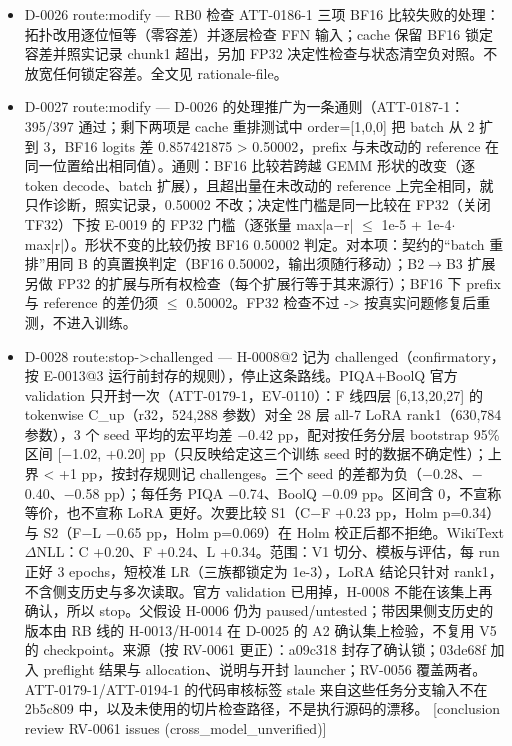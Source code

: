 \documentclass[11pt]{article}
\begin{document}
\begin{itemize}
\item D-0026 route:modify --- RB0 检查 ATT-0186-1 三项 BF16 比较失败的处理：拓扑改用逐位恒等（零容差）并逐层检查 FFN 输入；cache 保留 BF16 锁定容差并照实记录 chunk1 超出，另加 FP32 决定性检查与状态清空负对照。不放宽任何锁定容差。全文见 rationale-file。
\item D-0027 route:modify --- D-0026 的处理推广为一条通则（ATT-0187-1：395/397 通过；剩下两项是 cache 重排测试中 order=[1,0,0] 把 batch 从 2 扩到 3，BF16 logits 差 0.857421875 \textgreater{} 0.50002，prefix 与未改动的 reference 在同一位置给出相同值）。通则：BF16 比较若跨越 GEMM 形状的改变（逐 token decode、batch 扩展），且超出量在未改动的 reference 上完全相同，就只作诊断，照实记录，0.50002 不改；决定性门槛是同一比较在 FP32（关闭 TF32）下按 E-0019 的 FP32 门槛（逐张量 max|a\ensuremath{-}r| \ensuremath{\leq} 1e-5 + 1e-4\ensuremath{\cdot}max|r|）。形状不变的比较仍按 BF16 0.50002 判定。对本项：契约的``batch 重排''用同 B 的真置换判定（BF16 0.50002，输出须随行移动）；B2\ensuremath{\rightarrow}B3 扩展另做 FP32 的扩展与所有权检查（每个扩展行等于其来源行）；BF16 下 prefix 与 reference 的差仍须 \ensuremath{\leq} 0.50002。FP32 检查不过 -\textgreater{} 按真实问题修复后重测，不进入训练。
\item D-0028 route:stop-\textgreater{}challenged --- H-0008@2 记为 challenged（confirmatory，按 E-0013@3 运行前封存的规则），停止这条路线。PIQA+BoolQ 官方 validation 只开封一次（ATT-0179-1，EV-0110）：F 线四层 [6,13,20,27] 的 tokenwise C\_up（r32，524,288 参数）对全 28 层 all-7 LoRA rank1（630,784 参数），3 个 seed 平均的宏平均差 \ensuremath{-}0.42 pp，配对按任务分层 bootstrap 95\% 区间 [\ensuremath{-}1.02, +0.20] pp（只反映给定这三个训练 seed 时的数据不确定性）；上界 \textless{} +1 pp，按封存规则记 challenges。三个 seed 的差都为负（\ensuremath{-}0.28、\ensuremath{-}0.40、\ensuremath{-}0.58 pp）；每任务 PIQA \ensuremath{-}0.74、BoolQ \ensuremath{-}0.09 pp。区间含 0，不宣称等价，也不宣称 LoRA 更好。次要比较 S1（C\ensuremath{-}F +0.23 pp，Holm p=0.34）与 S2（F\ensuremath{-}L \ensuremath{-}0.65 pp，Holm p=0.069）在 Holm 校正后都不拒绝。WikiText \ensuremath{\Delta}NLL：C +0.20、F +0.24、L +0.34。范围：V1 切分、模板与评估，每 run 正好 3 epochs，短校准 LR（三族都锁定为 1e-3），LoRA 结论只针对 rank1，不含侧支历史与多次读取。官方 validation 已用掉，H-0008 不能在该集上再确认，所以 stop。父假设 H-0006 仍为 paused/untested；带因果侧支历史的版本由 RB 线的 H-0013/H-0014 在 D-0025 的 A2 确认集上检验，不复用 V5 的 checkpoint。来源（按 RV-0061 更正）：a09c318 封存了确认锁；03de68f 加入 preflight 结果与 allocation、说明与开封 launcher；RV-0056 覆盖两者。ATT-0179-1/ATT-0194-1 的代码审核标签 stale 来自这些任务分支输入不在 2b5c809 中，以及未使用的切片检查路径，不是执行源码的漂移。 [conclusion review RV-0061 issues (cross\_model\_unverified)]

\end{itemize}
\end{document}
